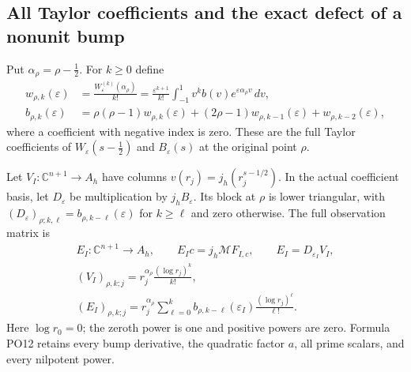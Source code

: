 \documentclass[11pt,a4paper]{article}
\theoremstyle{definition}\newtheorem{definition}[theorem]{Definition}
\newcommand{\C}{\mathbb C}\newcommand{\R}{\mathbb R}
\begin{document}
\subsection{All Taylor coefficients and the exact defect of a nonunit bump}

Put \(\alpha_\rho=\rho-\tfrac12\). For \(k\ge0\) define
\[
 \begin{aligned}
 w_{\rho,k}(\varepsilon)
   &=\frac{W_\varepsilon^{(k)}(\alpha_\rho)}{k!}
     =\frac{\varepsilon^{k+1}}{k!}
        \int_{-1}^1v^k b(v)e^{\varepsilon\alpha_\rho v}\,dv,\\
 b_{\rho,k}(\varepsilon)
   &=\rho(\rho-1)w_{\rho,k}(\varepsilon)
       +(2\rho-1)w_{\rho,k-1}(\varepsilon)+w_{\rho,k-2}(\varepsilon),
 \end{aligned}
 \tag{PO11}\label{PO:po:taylor}
\]
where a coefficient with negative index is zero. These are the
full Taylor coefficients of \(W_\varepsilon(s-\tfrac12)\) and
\(B_\varepsilon(s)\) at the original point \(\rho\).

Let \(V_I:\C^{n+1}\to A_h\) have columns
\(v(r_j)=j_h(r_j^{s-1/2})\). In the actual coefficient basis,
let \(D_\varepsilon\) be multiplication by \(j_hB_\varepsilon\).
Its block at \(\rho\) is lower triangular, with
\((D_\varepsilon)_{\rho;k,\ell}=b_{\rho,k-\ell}(\varepsilon)\) for \(k\ge\ell\)
and zero otherwise. The full observation matrix is
\[
 \begin{gathered}
 E_I:\C^{n+1}\longrightarrow A_h,\qquad
 E_Ic=j_h\mathcal M F_{I,c},\qquad E_I=D_{\varepsilon_I}V_I,\\
 (V_I)_{\rho,k;j}
       =r_j^{\alpha_\rho}\frac{(\log r_j)^k}{k!},\\
 (E_I)_{\rho,k;j}
       =r_j^{\alpha_\rho}\sum_{\ell=0}^k
           b_{\rho,k-\ell}(\varepsilon_I)\frac{(\log r_j)^\ell}{\ell!}.
 \end{gathered}
 \tag{PO12}\label{PO:po:matrix}
\]
Here \(\log r_0=0\); the zeroth power is one and positive powers
are zero. Formula PO12 retains every bump derivative, the quadratic
factor \(a\), all prime scalars, and every nilpotent power.
\end{document}
